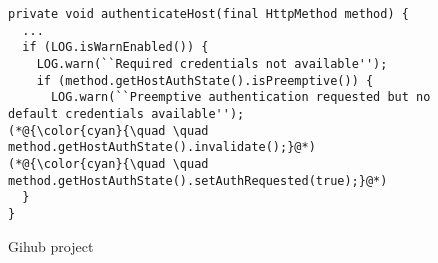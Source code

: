 \begin{figure}[t]
	\centering
\begin{lstlisting}[]
private void authenticateHost(final HttpMethod method) {
  ...
  if (LOG.isWarnEnabled()) {
    LOG.warn(``Required credentials not available'');
    if (method.getHostAuthState().isPreemptive()) {
      LOG.warn(``Preemptive authentication requested but no default credentials available'');
(*@{\color{cyan}{\quad \quad method.getHostAuthState().invalidate();}@*)
(*@{\color{cyan}{\quad \quad method.getHostAuthState().setAuthRequested(true);}@*)
  }
}
\end{lstlisting}
        \vspace{-12pt}
        \caption{Gihub project }
        \vspace{-6pt}
        \label{fig:example2}
\end{figure}
